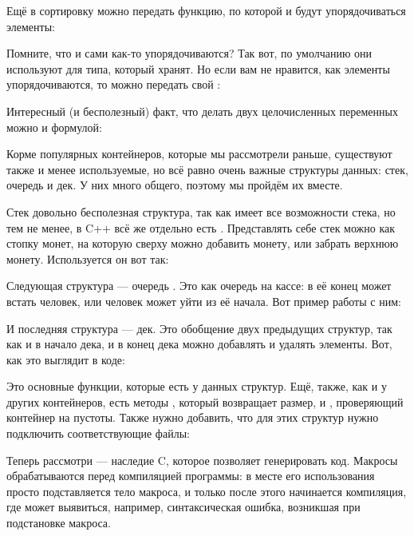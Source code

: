 
Ещё в сортировку можно передать функцию, по которой и будут упорядочиваться элементы:


Помните, что  и  сами как-то упорядочиваются? Так вот, по умолчанию они используют  для типа, который хранят. Но если вам не нравится, как элементы упорядочиваются, то можно передать свой :


Интересный (и бесполезный) факт, что делать  двух целочисленных переменных можно и формулой:



Корме популярных контейнеров, которые мы рассмотрели раньше, существуют также и менее используемые, но всё равно очень важные структуры данных: стек, очередь и дек. У них много общего, поэтому мы пройдём их вместе.

Стек довольно бесполезная структура, так как  имеет все возможности стека, но тем не менее, в C++ всё же отдельно есть . Представлять себе стек можно как стопку монет, на которую сверху можно добавить монету, или забрать верхнюю монету. Используется он вот так:


Следующая структура — очередь . Это как очередь на кассе: в её конец может встать человек, или человек может уйти из её начала. Вот пример работы с ним:


И последняя структура — дек. Это обобщение двух предыдущих структур, так как и в начало дека, и в конец дека можно добавлять и удалять элементы. Вот, как это выглядит в коде:


Это основные функции, которые есть у данных структур. Ещё, также, как и у других контейнеров, есть методы , который возвращает размер, и , проверяющий контейнер на пустоты. Также нужно добавить, что для этих структур нужно подключить соответствующие файлы:



\hypertarget{macros}{}
Теперь рассмотри  — наследие C, которое позволяет генерировать код. Макросы обрабатываются перед компиляцией программы: в месте его использования просто подставляется тело макроса, и только после этого начинается компиляция, где может выявиться, например, синтаксическая ошибка, возникшая при подстановке макроса.

